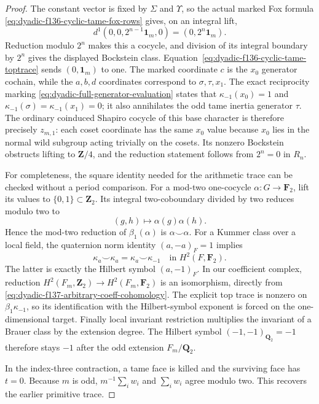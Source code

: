 \documentclass[11pt]{article}
\theoremstyle{definition}
\begin{document}
\begin{proof}
The constant vector is fixed by
$\Sigma$ and $\Upsilon$, so the
actual marked Fox formula
\eqref{eq:dyadic-f136-cyclic-tame-fox-rows}
gives, on an integral lift,
\[
d^1(0,0,2^{n-1}\mathbf1_m,0)
=(0,2^n\mathbf1_m).
\]
Reduction modulo $2^n$ makes this a
cocycle, and division of its integral
boundary by $2^n$ gives
the displayed Bockstein class.
Equation~\eqref{eq:dyadic-f136-cyclic-tame-toptrace}
sends $(0,\mathbf1_m)$ to one.
The marked coordinate $c$ is the $x_0$
generator cochain, while the $a,b,d$
coordinates correspond to
$\sigma,\tau,x_1$.
The exact reciprocity marking
\eqref{eq:dyadic-full-generator-evaluation}
states that $\kappa_{-1}(x_0)=1$
and $\kappa_{-1}(\sigma)=
\kappa_{-1}(x_1)=0$; it also
annihilates the odd tame inertia
generator $\tau$.
The ordinary coinduced Shapiro
cocycle of this base character is
therefore precisely $z_{m,1}$:
each coset coordinate has the same
$x_0$ value because $x_0$ lies
in the normal wild subgroup acting
trivially on the cosets.
Its nonzero Bockstein obstructs
lifting to $\mathbf Z/4$, and the
reduction statement follows from
$2^n=0$ in $R_n$.

For completeness, the square identity
needed for the arithmetic trace can
be checked without a period comparison.
For a mod-two one-cocycle
$\alpha:G\to\mathbf F_2$,
lift its values to $\{0,1\}\subset\mathbf Z_2$.
Its integral two-coboundary divided
by two reduces modulo two to
\[
(g,h)\longmapsto\alpha(g)\alpha(h).
\]
Hence the mod-two reduction of
$\beta_1(\alpha)$ is $\alpha\smile\alpha$.
For a Kummer class over a local field,
the quaternion norm identity
$(a,-a)_F=1$ implies
\[
\kappa_a\smile\kappa_a
=\kappa_a\smile\kappa_{-1}
\quad\text{in }H^2(F,\mathbf F_2).
\]
The latter is exactly the Hilbert
symbol $(a,-1)_F$.  In our coefficient
complex, reduction
$H^2(F_m,\mathbf Z_2)\to
 H^2(F_m,\mathbf F_2)$
is an isomorphism, directly from
\eqref{eq:dyadic-f137-arbitrary-coeff-cohomology}.
The explicit top trace is nonzero
on $\beta_1\kappa_{-1}$,
so its identification with the
Hilbert-symbol exponent is forced
on the one-dimensional target.
Finally local invariant restriction
multiplies the invariant of a Brauer
class by the extension degree.
The Hilbert symbol $(-1,-1)_{\mathbf Q_2}=-1$
therefore stays $-1$ after the odd
extension $F_m/\mathbf Q_2$.

In the index-three contraction,
a tame face is killed and the
surviving face has $t=0$.
Because $m$ is odd,
$m^{-1}\sum_iw_i$ and $\sum_iw_i$
agree modulo two.  This recovers
the earlier primitive trace.
\end{proof}
\end{document}
